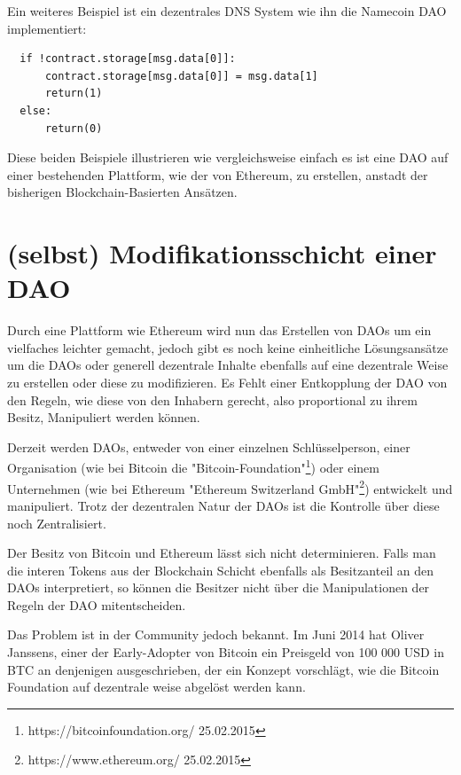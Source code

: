\documentclass[a4paper,12pt]{report}
\begin{document}
Ein weiteres Beispiel ist ein dezentrales DNS System wie ihn die Namecoin DAO implementiert: 

\begin{lstlisting}
  if !contract.storage[msg.data[0]]:
      contract.storage[msg.data[0]] = msg.data[1]
      return(1)
  else:
      return(0)
\end{lstlisting}

Diese beiden Beispiele illustrieren wie vergleichsweise einfach es ist eine DAO auf einer bestehenden Plattform, wie der von Ethereum, zu erstellen, anstadt der bisherigen Blockchain-Basierten Ansätzen.



\chapter{(selbst) Modifikationsschicht einer DAO}
\label{selfMod}
Durch eine Plattform wie Ethereum wird nun das Erstellen von DAOs um ein vielfaches leichter gemacht, jedoch gibt es noch keine einheitliche Lösungsansätze um die DAOs oder generell dezentrale Inhalte ebenfalls auf eine dezentrale Weise zu erstellen oder diese zu modifizieren. Es Fehlt einer Entkopplung der DAO von den Regeln, wie diese von den Inhabern gerecht, also proportional zu ihrem Besitz, Manipuliert werden können.

Derzeit werden DAOs, entweder von einer einzelnen Schlüsselperson, einer Organisation (wie bei Bitcoin die "Bitcoin-Foundation"\footnote{https://bitcoinfoundation.org/ 25.02.2015}) oder einem Unternehmen (wie bei Ethereum "Ethereum Switzerland GmbH"\footnote{https://www.ethereum.org/ 25.02.2015}) entwickelt und manipuliert. Trotz der dezentralen Natur der DAOs ist die Kontrolle über diese noch Zentralisiert. 

Der Besitz von Bitcoin und Ethereum lässt sich nicht determinieren. Falls man die interen Tokens aus der Blockchain Schicht ebenfalls als Besitzanteil an den DAOs interpretiert, so können die Besitzer nicht über die Manipulationen der Regeln der DAO mitentscheiden.

Das Problem ist in der Community jedoch bekannt. Im Juni 2014 hat Oliver Janssens, einer der Early-Adopter von Bitcoin ein Preisgeld von 100 000 USD in BTC an denjenigen ausgeschrieben, der ein Konzept vorschlägt, wie die Bitcoin Foundation auf dezentrale weise abgelöst werden kann.
\end{document}
